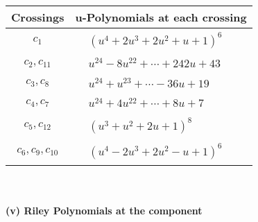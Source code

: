 \documentclass[1p]{elsarticle_modified}
\theoremstyle{definition}
\begin{document}
\begin{tabular}{m{50pt}|m{274pt}}
Crossings & \hspace{64pt}u-Polynomials at each crossing \\
\hline $$\begin{aligned}c_{1}\end{aligned}$$&$\begin{aligned}
&(u^4+2 u^3+2 u^2+u+1)^6
\end{aligned}$\\
\hline $$\begin{aligned}c_{2},c_{11}\end{aligned}$$&$\begin{aligned}
&u^{24}-8 u^{22}+\cdots+242 u+43
\end{aligned}$\\
\hline $$\begin{aligned}c_{3},c_{8}\end{aligned}$$&$\begin{aligned}
&u^{24}+u^{23}+\cdots-36 u+19
\end{aligned}$\\
\hline $$\begin{aligned}c_{4},c_{7}\end{aligned}$$&$\begin{aligned}
&u^{24}+4 u^{22}+\cdots+8 u+7
\end{aligned}$\\
\hline $$\begin{aligned}c_{5},c_{12}\end{aligned}$$&$\begin{aligned}
&(u^3+u^2+2 u+1)^8
\end{aligned}$\\
\hline $$\begin{aligned}c_{6},c_{9},c_{10}\end{aligned}$$&$\begin{aligned}
&(u^4-2 u^3+2 u^2- u+1)^6
\end{aligned}$\\
\hline
\end{tabular}\\~\\
\newpage\renewcommand{\arraystretch}{1}
\flushleft \textbf{(v) Riley Polynomials at the component}\newline \\
\end{document}
